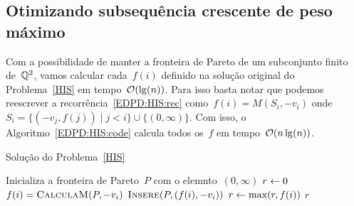 
\subsection{Otimizando subsequência crescente de peso máximo}

Com a possibilidade de manter a fronteira de Pareto de um subconjunto finito de~$\mathbb{Q}^2$, vamos calcular cada~$f(i)$ definido na solução original do Problema~\ref{HIS} em tempo~$\mathcal{O}(\lg(n))$. Para isso basta notar que podemos reescrever a recorrência~\ref{EDPD:HIS:rec} como~$f(i) = M(S_i,-v_i)$ onde~$S_i = \{(-v_j,f(j)) \mid j < i\} \cup \{(0,\infty)\}$. Com isso, o Algoritmo~\ref{EDPD:HIS:code} calcula todos os~$f$ em tempo~$\mathcal{O}(n\lg(n))$.

\begin{algorithm}[h]
\caption{Solução do Problema~\ref{HIS}}
\label{EDPD:HIS:code}
\begin{algorithmic}[1]
    \State Inicializa a fronteira de Pareto~$P$ com o elemnto~$(0,\infty)$
    \State $r \leftarrow 0$
        \State $f(i) = \textsc{CalculaM}(P,-v_i)$
        \State $\textsc{Insere}(P,(f(i),-v_i))$
        \State $r \leftarrow \max(r,f(i))$
    \EndFor
    \State \Return $r$
\EndFunction
\end{algorithmic}
\end{algorithm}
